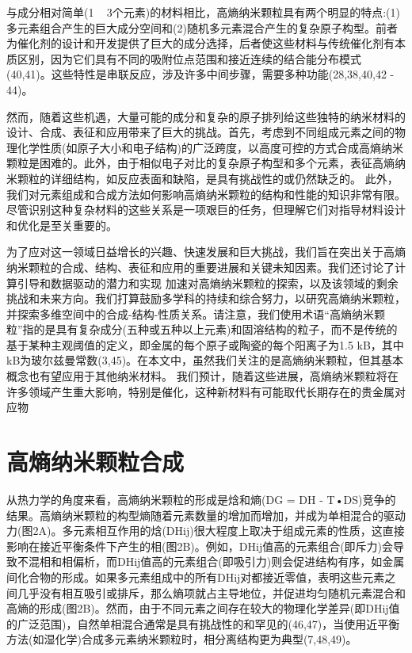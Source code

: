 \documentclass[a4paper]{article}
\begin{document}
与成分相对简单(1 ~ 3个元素)的材料相比，高熵纳米颗粒具有两个明显的特点:(1)多元素组合产生的巨大成分空间和(2)随机多元素混合产生的复杂原子构型。前者为催化剂的设计和开发提供了巨大的成分选择，后者使这些材料与传统催化剂有本质区别，因为它们具有不同的吸附位点范围和接近连续的结合能分布模式(40,41)。这些特性是串联反应，涉及许多中间步骤，需要多种功能(28,38,40,42 - 44)。



然而，随着这些机遇，大量可能的成分和复杂的原子排列给这些独特的纳米材料的设计、合成、表征和应用带来了巨大的挑战。首先，考虑到不同组成元素之间的物理化学性质(如原子大小和电子结构)的广泛跨度，以高度可控的方式合成高熵纳米颗粒是困难的。此外，由于相似电子对比的复杂原子构型和多个元素，表征高熵纳米颗粒的详细结构，如反应表面和缺陷，是具有挑战性的或仍然缺乏的。
此外，我们对元素组成和合成方法如何影响高熵纳米颗粒的结构和性能的知识非常有限。尽管识别这种复杂材料的这些关系是一项艰巨的任务，但理解它们对指导材料设计和优化是至关重要的。


为了应对这一领域日益增长的兴趣、快速发展和巨大挑战，我们旨在突出关于高熵纳米颗粒的合成、结构、表征和应用的重要进展和关键未知因素。我们还讨论了计算引导和数据驱动的潜力和实现
加速对高熵纳米颗粒的探索，以及该领域的剩余挑战和未来方向。我们打算鼓励多学科的持续和综合努力，以研究高熵纳米颗粒，并探索多维空间中的合成-结构-性质关系。请注意，我们使用术语“高熵纳米颗粒”指的是具有复杂成分(五种或五种以上元素)和固溶结构的粒子，而不是传统的基于某种主观阈值的定义，即金属的每个原子或陶瓷的每个阳离子为1.5 kB，其中kB为玻尔兹曼常数(3,45)。在本文中，虽然我们关注的是高熵纳米颗粒，但其基本概念也有望应用于其他纳米材料。
我们预计，随着这些进展，高熵纳米颗粒将在许多领域产生重大影响，特别是催化，这种新材料有可能取代长期存在的贵金属对应物



\section*{高熵纳米颗粒合成}

从热力学的角度来看，高熵纳米颗粒的形成是焓和熵(DG = DH - T•DS)竞争的结果。高熵纳米颗粒的构型熵随着元素数量的增加而增加，并成为单相混合的驱动力(图2A)。多元素相互作用的焓(DHij)很大程度上取决于组成元素的性质，这直接影响在接近平衡条件下产生的相(图2B)。例如，DHij值高的元素组合(即斥力)会导致不混相和相偏析，而DHij值高的元素组合(即吸引力)则会促进结构有序，如金属间化合物的形成。如果多元素组成中的所有DHij对都接近零值，表明这些元素之间几乎没有相互吸引或排斥，那么熵项就占主导地位，并促进均匀随机元素混合和高熵的形成(图2B)。然而，由于不同元素之间存在较大的物理化学差异(即DHij值的广泛范围)，自然单相混合通常是具有挑战性的和罕见的(46,47)，当使用近平衡方法(如湿化学)合成多元素纳米颗粒时，相分离结构更为典型(7,48,49)。
\end{document}
